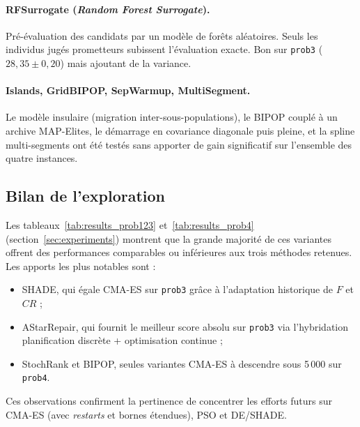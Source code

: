 \paragraph{RFSurrogate (\textit{Random Forest Surrogate}).}
Pré-évaluation des candidats par un modèle de forêts aléatoires.  Seuls les
individus jugés prometteurs subissent l'évaluation exacte.  Bon sur
\texttt{prob3} ($28{,}35 \pm 0{,}20$) mais ajoutant de la variance.

\paragraph{Islands, GridBIPOP, SepWarmup, MultiSegment.}
Le modèle insulaire (migration inter-sous-populations), le BIPOP couplé à un
archive MAP-Elites, le démarrage en covariance diagonale puis pleine, et la
spline multi-segments ont été testés sans apporter de gain significatif sur
l'ensemble des quatre instances.

\subsection{Bilan de l'exploration}

Les tableaux~\ref{tab:results_prob123} et~\ref{tab:results_prob4}
(section~\ref{sec:experiments}) montrent que
la grande majorité de ces variantes offrent des performances comparables ou
inférieures aux trois méthodes retenues.  Les apports les plus notables sont :
\begin{itemize}[nosep]
  \item SHADE, qui égale CMA-ES sur \texttt{prob3} grâce à l'adaptation
        historique de $F$ et $CR$ ;
  \item AStarRepair, qui fournit le meilleur score absolu sur \texttt{prob3}
        via l'hybridation planification discrète + optimisation continue ;
  \item StochRank et BIPOP, seules variantes CMA-ES à descendre sous 5\,000
        sur \texttt{prob4}.
\end{itemize}
Ces observations confirment la pertinence de concentrer les efforts futurs sur
CMA-ES (avec \textit{restarts} et bornes étendues), PSO et DE/SHADE.
